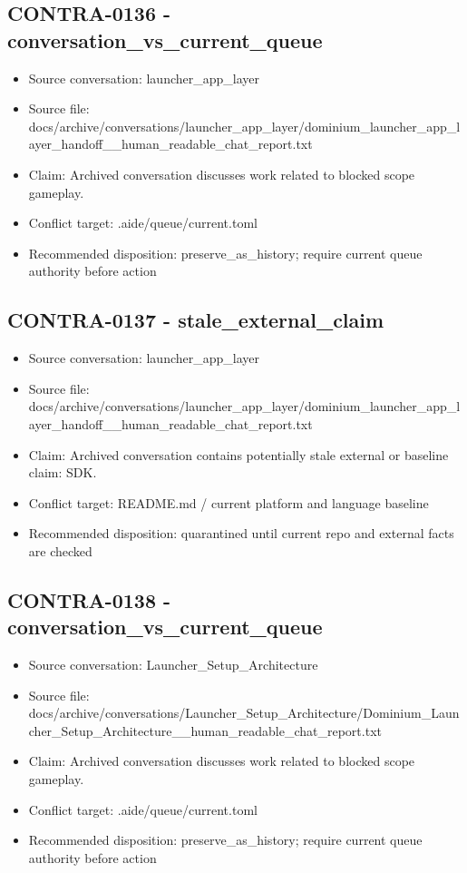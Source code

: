 \documentclass[11pt,a4paper]{report}
\begin{document}
\subsection{CONTRA-0136 - conversation\_vs\_current\_queue}

\begin{itemize}
\item Source conversation: launcher\_app\_layer
\item Source file: docs/archive/conversations/launcher\_app\_layer/dominium\_launcher\_app\_layer\_handoff\_\_human\_readable\_chat\_report.txt
\item Claim: Archived conversation discusses work related to blocked scope gameplay.
\item Conflict target: .aide/queue/current.toml
\item Recommended disposition: preserve\_as\_history; require current queue authority before action
\end{itemize}

\subsection{CONTRA-0137 - stale\_external\_claim}

\begin{itemize}
\item Source conversation: launcher\_app\_layer
\item Source file: docs/archive/conversations/launcher\_app\_layer/dominium\_launcher\_app\_layer\_handoff\_\_human\_readable\_chat\_report.txt
\item Claim: Archived conversation contains potentially stale external or baseline claim: SDK.
\item Conflict target: README.md / current platform and language baseline
\item Recommended disposition: quarantined until current repo and external facts are checked
\end{itemize}

\subsection{CONTRA-0138 - conversation\_vs\_current\_queue}

\begin{itemize}
\item Source conversation: Launcher\_Setup\_Architecture
\item Source file: docs/archive/conversations/Launcher\_Setup\_Architecture/Dominium\_Launcher\_Setup\_Architecture\_\_human\_readable\_chat\_report.txt
\item Claim: Archived conversation discusses work related to blocked scope gameplay.
\item Conflict target: .aide/queue/current.toml
\item Recommended disposition: preserve\_as\_history; require current queue authority before action
\end{itemize}
\end{document}
